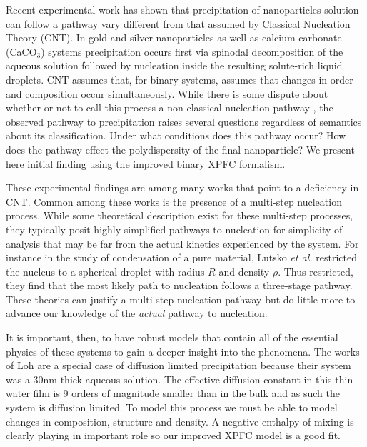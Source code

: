 Recent experimental work has shown that precipitation of nanoparticles solution
can follow a pathway vary different from that assumed by Classical Nucleation
Theory (CNT).  In gold and silver nanoparticles\cite{LOH17} as well as calcium
carbonate (CaCO${}_3$)\cite{WALLACE13} systems precipitation occurs first via
spinodal decomposition of the aqueous solution followed by nucleation inside
the resulting solute-rich liquid droplets. CNT assumes that, for binary
systems, assumes that changes in order and composition occur simultaneously.
While there is some dispute about whether or not to call this process a
non-classical nucleation pathway \cite{DAVEY13, GEBAUER11}, the observed pathway
to precipitation raises several questions regardless of semantics about its
classification. Under what conditions does this pathway occur? How does the 
pathway effect the polydispersity of the final nanoparticle? We present here
initial finding using the improved binary XPFC formalism.

These experimental findings are among many works that point to a deficiency in
CNT. Common among these works is the presence of a multi-step nucleation
process. While some theoretical description exist for these multi-step
processes, they typically posit highly simplified pathways to nucleation for
simplicity of analysis that may be far from the actual kinetics experienced by
the system.  For instance in the study of condensation of a pure material,
Lutsko \textit{et al.} \cite{LUTSKO15} restricted the nucleus to a spherical
droplet with radius $R$ and density $\rho$. Thus restricted, they find that the
most likely path to nucleation follows a three-stage pathway.  These theories
can justify a multi-step nucleation pathway but do little more to advance our
knowledge of the \textit{actual} pathway to nucleation.

It is important, then, to have robust models that contain all of the essential
physics of these systems to gain a deeper insight into the phenomena. The works
of Loh \cite{LOH17} are a special case of diffusion limited precipitation because
their system was a 30nm thick aqueous solution. The effective diffusion
constant in this thin water film is 9 orders of magnitude smaller than in the
bulk and as such the system is diffusion limited. To model this process we must
be able to  model changes in composition, structure and density. A negative
enthalpy of mixing is clearly playing in important role so our improved XPFC
model is a good fit.

